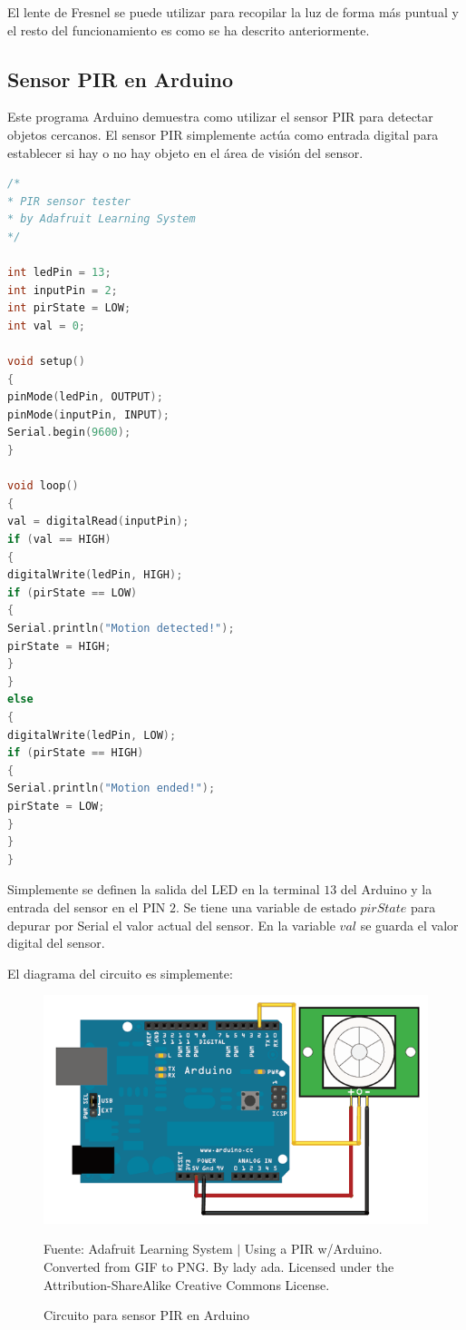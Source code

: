 \documentclass[conference]{IEEEtran}
\begin{document}
    El lente de Fresnel se puede utilizar para recopilar la luz de forma más puntual y el resto del funcionamiento es como se ha descrito anteriormente.

    \subsection{Sensor PIR en Arduino}

    Este programa Arduino demuestra como utilizar el sensor PIR para detectar objetos cercanos. El sensor PIR simplemente actúa como entrada digital para establecer si hay o no hay objeto en el área de visión del sensor.

    \begin{lstlisting}[language=C, caption=Sensor PIR en Arduino. Fuente: Adafruit Learning System $\mid$ PIR Motion Sensor \cite{adafruit-learning-system-pir-sensor-2014A}]
/*
* PIR sensor tester
* by Adafruit Learning System
*/

int ledPin = 13;
int inputPin = 2;
int pirState = LOW;
int val = 0;

void setup()
{
pinMode(ledPin, OUTPUT);
pinMode(inputPin, INPUT);
Serial.begin(9600);
}

void loop()
{
val = digitalRead(inputPin);
if (val == HIGH)
{
digitalWrite(ledPin, HIGH);
if (pirState == LOW)
{
Serial.println("Motion detected!");
pirState = HIGH;
}
}
else
{
digitalWrite(ledPin, LOW);
if (pirState == HIGH)
{
Serial.println("Motion ended!");
pirState = LOW;
}
}
}
\end{lstlisting}

\bigbreak

Simplemente se definen la salida del LED en la terminal $13$ del Arduino y la entrada del sensor en el PIN $2$. Se tiene una variable de estado $pirState$ para depurar por Serial el valor actual del sensor. En la variable $val$ se guarda el valor digital del sensor.

\bigbreak

El diagrama del circuito es simplemente:

\begin{figure}[H]
\centering
\includegraphics[width=0.3\paperwidth]{images/proximity-pir-arduino-circuit.png}
\caption{Circuito para sensor PIR en Arduino}
\footnotesize
Fuente: Adafruit Learning System $\mid$ Using a PIR w/Arduino. Converted from GIF to PNG. By lady ada. Licensed under the Attribution-ShareAlike Creative Commons License.
\end{figure}
\end{document}
